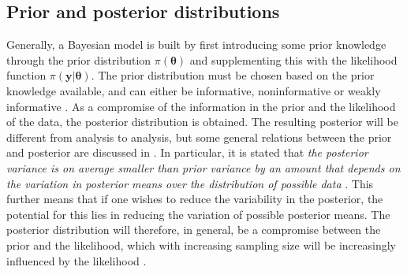 \subsection{Prior and posterior distributions}
Generally, a Bayesian model is built by first introducing some prior knowledge through the prior distribution $\pi(\boldsymbol{\theta})$ and supplementing this with the likelihood function $\pi(\mathbf{y} \lvert \boldsymbol{\theta})$.
The prior distribution must be chosen based on the prior knowledge available, and can either be informative, noninformative or weakly informative \citep{gelman2015Bayesian}. 
As a compromise of the information in the prior and the likelihood of the data, the posterior distribution is obtained. 
The resulting posterior will be different from analysis to analysis, but some general relations between the prior and posterior are discussed in \citet{gelman2015Bayesian}.
In particular, it is stated that \textit{the posterior variance is on average smaller than prior variance by an amount that depends on the variation in posterior means over the distribution of possible data} \citep{gelman2015Bayesian}.
This further means that if one wishes to reduce the variability in the posterior, the potential for this lies in reducing the variation of possible posterior means.
The posterior distribution will therefore, in general, be a compromise between the prior and the likelihood, which with increasing sampling size will be increasingly influenced by the likelihood \citep{gelman2015Bayesian}.

